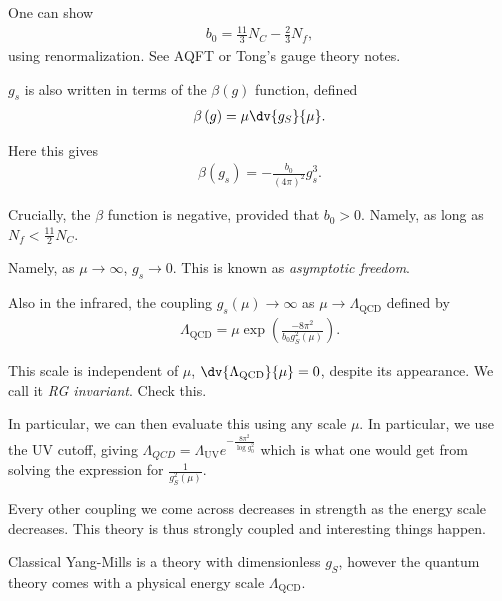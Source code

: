 
One can show
\begin{align}
    b_0 = \frac{11}{3} N_C - \frac{2}{3} N_f
,\end{align}
using renormalization. See AQFT or Tong's gauge theory notes.

$g_s$ is also written in terms of the $\beta\left( g \right)$ function, defined
\begin{align}
    \beta \left( g \right) = \mu \dv{g_S}{\mu}
.\end{align}

Here this gives
\begin{align}
    \beta \left( g_s \right) = -\frac{b_0}{\left( 4\pi \right)^2} g_s^3
.\end{align}

Crucially, the $\beta$ function is negative, provided that $b_0 > 0$. Namely, as long as $N_f < \frac{11}{2} N_C$.


Namely, as $\mu \to \infty$, $g_s \to 0$. This is known as \emph{asymptotic freedom}.

Also in the infrared, the coupling $g_s \left( \mu \right) \to \infty$ as $\mu \to \Lambda_\text{QCD}$ defined by 
\begin{align}
    \Lambda_\text{QCD} = \mu \exp \left( \frac{-8 \pi^2}{b_0 g_S^2 \left( \mu \right) } \right) 
.\end{align}

\begin{note}
    This scale is independent of $\mu$, $\dv{\Lambda_\text{QCD}}{\mu} = 0$, despite its appearance. We call it \emph{RG invariant}. Check this.
\end{note}

In particular, we can then evaluate this using any scale $\mu$. In particular, we use the UV cutoff, giving $\Lambda_{QCD} = \Lambda_{\text{UV}} e^{-\frac{8\pi^2}{\log g_0^2}}$ which is what one would get from solving the expression for $\frac{1}{g_S^2\left( \mu \right) }$.

Every other coupling we come across decreases in strength as the energy scale decreases. This theory is thus strongly coupled and interesting things happen.

\begin{note}
    Classical Yang-Mills is a theory with dimensionless $g_S$, however the  quantum theory comes with a physical energy scale $\Lambda_\text{QCD}$.
\end{note}

